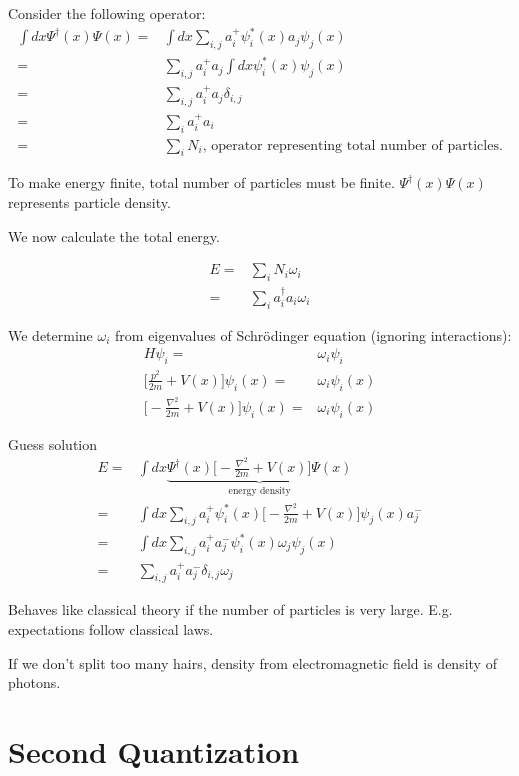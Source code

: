 \documentclass[]{article}
\begin{document}
Consider the following operator:
\begin{align*}
\int dx \Psi^\dagger(x) \Psi(x)=&\int dx \sum_{i,j}a^+_i\psi_i^*(x) a_j\psi_j(x)\\
=&\sum_{i,j} a^+_i a_j \int dx \psi_i^*(x) \psi_j(x)\\
=&\sum_{i,j} a^+_i a_j \delta_{i,j}\\
=&\sum_i a^+_i a_i\\
=&\sum_i N_i\text{, operator representing total number of particles.}
\end{align*}

To make energy finite, total number of particles must be finite. $\Psi^\dagger(x) \Psi(x)$ represents particle density.

We now calculate the total energy.

\begin{align*}
E =& \sum_{i} N_i \omega_i\\
=& \sum_{i} a^\dagger_i a_i \omega_i
\end{align*}

We determine $\omega_i$ from eigenvalues of Schr\"odinger equation (ignoring interactions):
\begin{align*}
H \psi_i =& \omega_i \psi_i\\
\big[\frac{p^2}{2m} + V(x)\big]\psi_i(x)=& \omega_i \psi_i(x)\\
\big[-\frac{\nabla^2}{2m} + V(x)\big]\psi_i(x)=& \omega_i \psi_i(x)
\end{align*}

Guess solution
\begin{align*}
E=&\int dx \underbrace{\Psi^\dagger(x) \big[-\frac{\nabla^2}{2m} + V(x)\big] \Psi(x)}_\text{energy density} \\
=& \int dx \sum_{i,j}a^+_i\psi_i^*(x)\big[-\frac{\nabla^2}{2m} + V(x)\big]\psi_j(x)a^-_j\\
=& \int dx \sum_{i,j} a^+_i a^-_j \psi_i^*(x) \omega_j \psi_j(x)\\
=&  \sum_{i,j} a^+_i a^-_j \delta_{i,j} \omega_j
\end{align*}

Behaves like classical theory if the number of particles is very large. E.g. expectations follow classical laws.

If we don't split too many hairs, density from electromagnetic field is density of photons.

\section {Second Quantization}
\end{document}

